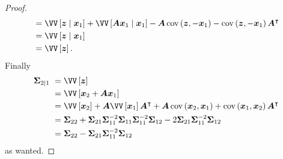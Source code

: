 \begin{proof}
\begin{align*}
         & = \VV \left[ \bm{z} \mid \bm{x}_1 \right] + \VV \left[ \bm{A} \bm{x}_1 \mid \bm{x}_1 \right] - \bm{A} \operatorname{cov} \left( \bm{z} , - \bm{x}_{1} \right) - \operatorname{cov} \left( \bm{z} , - \bm{x}_{1} \right) \bm{A}^{\intercal} \\
         & = \VV \left[ \bm{z} \mid \bm{x}_1 \right]                                                                                                                                                                                                  \\
         & = \VV \left[ \bm{z} \right].
    \end{align*}
    Finally
    \begin{align*}
        \bm{\Sigma}_{2 \mid 1} \
         & = \VV \left[ \bm{z} \right]                                                                                                                                                                                                     \\
         & = \VV \left[ \bm{x}_2 + \bm{A} \bm{x}_{1} \right]                                                                                                                                                                               \\
         & = \VV \left[ \bm{x}_2 \right] + \bm{A} \VV \left[ \bm{x}_1 \right] \bm{A}^{\intercal} + \bm{A} \operatorname{cov} \left( \bm{x}_2 , \bm{x}_1 \right) + \operatorname{cov} \left( \bm{x}_1 , \bm{x}_2 \right) \bm{A}^{\intercal} \\
         & = \bm{\Sigma}_{22} + \bm{\Sigma}_{21} \bm{\Sigma}_{11}^{-2} \bm{\Sigma}_{11} \bm{\Sigma}_{11}^{-2} \bm{\Sigma}_{12} - 2 \bm{\Sigma}_{21} \bm{\Sigma}_{11}^{-2} \bm{\Sigma}_{12}                                                 \\
         & = \bm{\Sigma}_{22} - \bm{\Sigma}_{21} \bm{\Sigma}_{11}^{-2} \bm{\Sigma}_{12}
    \end{align*}
    as wanted.
\end{proof}

